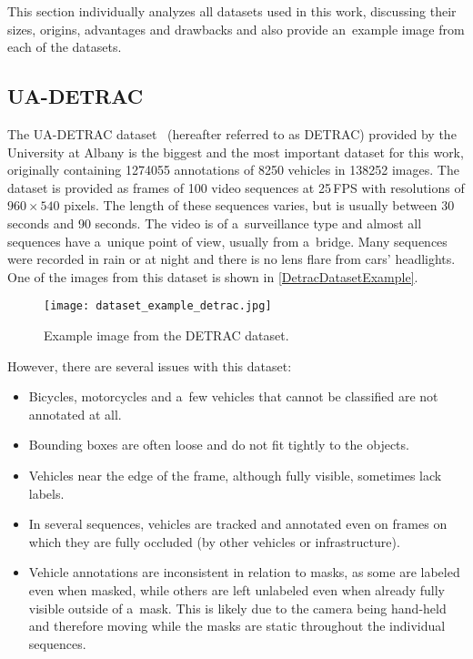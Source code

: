 
This section individually analyzes all datasets used in this work, discussing
their sizes, origins, advantages and drawbacks and also provide an~example image
from each of the datasets.


\subsection{UA-DETRAC}
\label{DetracDataset}

The UA-DETRAC dataset~\cite{detrac} (hereafter referred to as DETRAC) provided
by the University at Albany is the biggest and the most important dataset for
this work, originally containing \num{1274055} annotations of \num{8250}
vehicles in \num{138252} images. The dataset is provided as frames of 100 video
sequences at 25\,FPS with resolutions of $960 \times 540$ pixels. The length of
these sequences varies, but is usually between 30 seconds and 90 seconds. The
video is of a~surveillance type and almost all sequences have a~unique point of
view, usually from a~bridge. Many sequences were recorded in rain or at night
and there is no lens flare from cars' headlights. One of the images from this
dataset is shown in \autoref{DetracDatasetExample}.

\begin{figure}[t]
    \centering
    \texttt{[image: dataset\_example\_detrac.jpg]}
    \caption{Example image from the DETRAC dataset.}
    \label{DetracDatasetExample}
\end{figure}

However, there are several issues with this dataset:
\begin{itemize}
    \item Bicycles, motorcycles and a~few vehicles that cannot be classified are
    not annotated at all.
    \item Bounding boxes are often loose and do not fit tightly to the objects.
    \item Vehicles near the edge of the frame, although fully visible, sometimes
    lack labels.
    \item In several sequences, vehicles are tracked and annotated even on
    frames on which they are fully occluded (by other vehicles or
    infrastructure).
    \item Vehicle annotations are inconsistent in relation to masks, as some are
    labeled even when masked, while others are left unlabeled even when already
    fully visible outside of a~mask. This is likely due to the camera being
    hand-held and therefore moving while the masks are static throughout the
    individual sequences.
\end{itemize}

